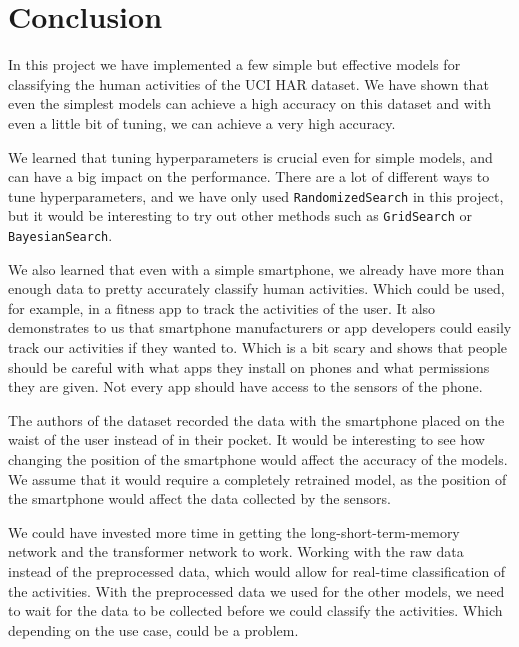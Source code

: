 \section{Conclusion}\label{sec:conclusion}

In this project we have implemented a few simple but effective models for classifying the human activities of the UCI HAR dataset.
We have shown that even the simplest models can achieve a high accuracy on this dataset and with even a little bit of tuning, we can achieve a very high accuracy.

We learned that tuning hyperparameters is crucial even for simple models, and can have a big impact on the performance.
There are a lot of different ways to tune hyperparameters, and we have only used \texttt{RandomizedSearch} in this project, but it would be interesting to try out other methods such as \texttt{GridSearch} or \texttt{BayesianSearch}.

We also learned that even with a simple smartphone, we already have more than enough data to pretty accurately classify human activities.
Which could be used, for example, in a fitness app to track the activities of the user.
It also demonstrates to us that smartphone manufacturers or app developers could easily track our activities if they wanted to.
Which is a bit scary and shows that people should be careful with what apps they install on phones and what permissions they are given.
Not every app should have access to the sensors of the phone.

The authors of the dataset recorded the data with the smartphone placed on the waist of the user instead of in their pocket.
It would be interesting to see how changing the position of the smartphone would affect the accuracy of the models.
We assume that it would require a completely retrained model, as the position of the smartphone would affect the data collected by the sensors.

We could have invested more time in getting the long-short-term-memory network and the transformer network to work.
Working with the raw data instead of the preprocessed data, which would allow for real-time classification of the activities.
With the preprocessed data we used for the other models, we need to wait for the data to be collected before we could classify the activities.
Which depending on the use case, could be a problem.

